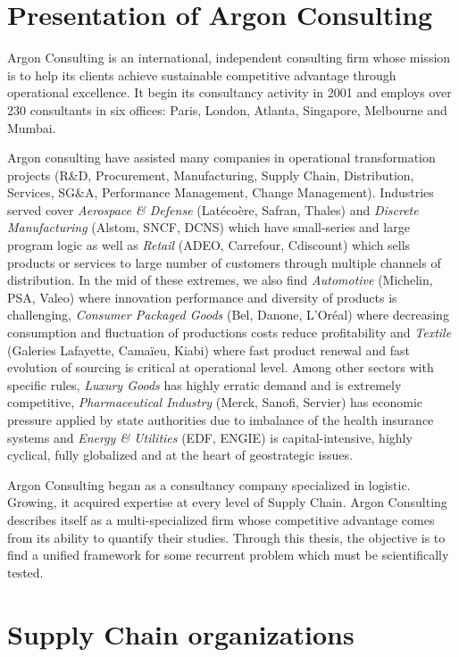 \section{Presentation of Argon Consulting}


Argon Consulting is an international, independent consulting firm whose mission is to help its clients achieve sustainable competitive advantage through operational excellence.
It begin its consultancy activity in 2001 and employs over 230 consultants in six offices: Paris, London, Atlanta, Singapore, Melbourne and Mumbai.


Argon consulting have assisted many companies in operational transformation projects (R\&D, Procurement, Manufacturing, Supply Chain, Distribution, Services, SG\&A, Performance Management, Change Management).
Industries served cover
\emph{Aerospace \& Defense} (Lat\'eco\`ere, Safran, Thales) and
\emph{Discrete Manufacturing} (Alstom, SNCF, DCNS) which have small-series and large program logic as well as
\emph{Retail} (ADEO, Carrefour, Cdiscount) which sells products or services to large number of customers through multiple channels of distribution.
In the mid of these extremes, we also find
\emph{Automotive} (Michelin, PSA, Valeo) where innovation performance and diversity of products is challenging,
\emph{Consumer Packaged Goods} (Bel, Danone, L'Oréal) where decreasing consumption and fluctuation of productions costs reduce profitability and
\emph{Textile} (Galeries Lafayette, Cama\"ieu, Kiabi) where fast product renewal and fast evolution of sourcing is critical at operational level.
Among other sectors with specific rules,
\emph{Luxury Goods} has highly erratic demand and is extremely competitive,
\emph{Pharmaceutical Industry} (Merck, Sanofi, Servier) has economic pressure applied by state authorities due to imbalance of the health insurance systems and
\emph{Energy \& Utilities} (EDF, ENGIE) is capital-intensive, highly cyclical, fully globalized and at the heart of geostrategic issues.


Argon Consulting began as a consultancy company specialized in logistic.
Growing, it acquired expertise at every level of Supply Chain.
Argon Consulting describes itself as a multi-specialized firm whose competitive advantage comes from its ability to quantify their studies.
Through this thesis, the objective is to find a unified framework for some recurrent problem which must be scientifically tested.



\section{Supply Chain organizations}


